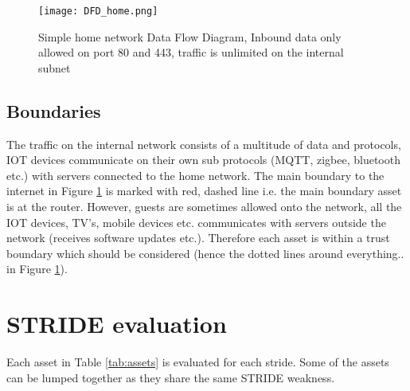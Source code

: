 \documentclass[
	letterpaper, %
	10pt, %
	unnumberedsections, %
	twoside, %
]{APAAssignment}
\begin{document}
\begin{figure}[!htp] %
	\centering
	\texttt{[image: DFD\_home.png]}
	\caption{Simple home network Data Flow Diagram, Inbound data only allowed on port 80 and 443, traffic is unlimited on the internal subnet}
	\label{fig:DFD}
\end{figure}


\subsection{Boundaries}
The traffic on the internal network consists of a multitude of data and protocols, IOT devices communicate on their own sub protocols (MQTT, zigbee, bluetooth etc.) with servers connected to the home network.
The main boundary to the internet in Figure \ref{fig:DFD} is marked with red, dashed line i.e. the main boundary asset is at the router. However, guests are sometimes allowed onto the network, all the IOT devices, TV's, mobile devices etc. communicates with servers outside the network (receives software updates etc.). Therefore each asset is within a trust boundary which should be considered (hence the dotted lines around everything.. in Figure \ref{fig:DFD}). 


\section{STRIDE evaluation}
Each asset in Table \ref{tab:assets} is evaluated for each stride. Some of the assets can be lumped together as they share the same STRIDE weakness. 
\end{document}
